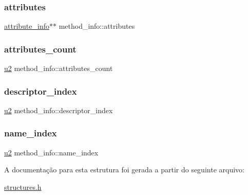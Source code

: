 \mbox{\label{structmethod__info_ab6e323f51c4f05e92c09e3ac5e7e07dc}} 
\subsubsection{\texorpdfstring{attributes}{attributes}}
{\footnotesize\ttfamily \hyperlink{structattribute__info}{attribute\+\_\+info}$\ast$$\ast$ method\+\_\+info\+::attributes}

\mbox{\label{structmethod__info_ad9e5e1e2fc850806addadd6deab8565d}} 
\subsubsection{\texorpdfstring{attributes\+\_\+count}{attributes\_count}}
{\footnotesize\ttfamily \hyperlink{lista__operandos_8h_a732cde1300aafb73b0ea6c2558a7a54f}{u2} method\+\_\+info\+::attributes\+\_\+count}

\mbox{\label{structmethod__info_a7713103e0c8d060630ad62774fb9be37}} 
\subsubsection{\texorpdfstring{descriptor\+\_\+index}{descriptor\_index}}
{\footnotesize\ttfamily \hyperlink{lista__operandos_8h_a732cde1300aafb73b0ea6c2558a7a54f}{u2} method\+\_\+info\+::descriptor\+\_\+index}

\mbox{\label{structmethod__info_ab91d62d0658b77bba83f6bb685e3bbb9}} 
\subsubsection{\texorpdfstring{name\+\_\+index}{name\_index}}
{\footnotesize\ttfamily \hyperlink{lista__operandos_8h_a732cde1300aafb73b0ea6c2558a7a54f}{u2} method\+\_\+info\+::name\+\_\+index}



A documentação para esta estrutura foi gerada a partir do seguinte arquivo\+:\begin{DoxyCompactItemize}
\item 
\hyperlink{structures_8h}{structures.\+h}\end{DoxyCompactItemize}

